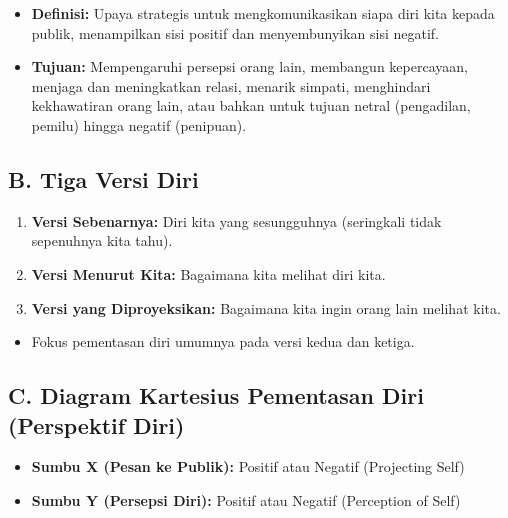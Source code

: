 \documentclass[
  letterpaper,
  DIV=11,
  numbers=noendperiod]{scrreprt}
\providecommand{\tightlist}{%
  \setlength{\itemsep}{0pt}\setlength{\parskip}{0pt}}
\begin{document}
\begin{itemize}
\tightlist
\item
  \textbf{Definisi:} Upaya strategis untuk mengkomunikasikan siapa diri
  kita kepada publik, menampilkan sisi positif dan menyembunyikan sisi
  negatif.
\item
  \textbf{Tujuan:} Mempengaruhi persepsi orang lain, membangun
  kepercayaan, menjaga dan meningkatkan relasi, menarik simpati,
  menghindari kekhawatiran orang lain, atau bahkan untuk tujuan netral
  (pengadilan, pemilu) hingga negatif (penipuan).
\end{itemize}

\subsection{B. Tiga Versi Diri}\label{b.-tiga-versi-diri}

\begin{enumerate}
\def\labelenumi{\arabic{enumi}.}
\tightlist
\item
  \textbf{Versi Sebenarnya:} Diri kita yang sesungguhnya (seringkali
  tidak sepenuhnya kita tahu).
\item
  \textbf{Versi Menurut Kita:} Bagaimana kita melihat diri kita.
\item
  \textbf{Versi yang Diproyeksikan:} Bagaimana kita ingin orang lain
  melihat kita.
\end{enumerate}

\begin{itemize}
\tightlist
\item
  Fokus pementasan diri umumnya pada versi kedua dan ketiga.
\end{itemize}

\subsection{C. Diagram Kartesius Pementasan Diri (Perspektif
Diri)}\label{c.-diagram-kartesius-pementasan-diri-perspektif-diri}

\begin{itemize}
\tightlist
\item
  \textbf{Sumbu X (Pesan ke Publik):} Positif atau Negatif (Projecting
  Self)
\item
  \textbf{Sumbu Y (Persepsi Diri):} Positif atau Negatif (Perception of
  Self)
\end{itemize}
\end{document}
